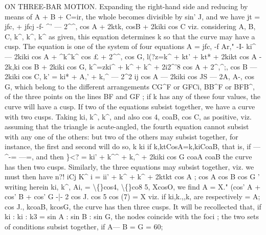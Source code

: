 \documentclass[12pt,a4paper]{article}
\begin{document}
ON THREE-BAR MOTION.
Expanding
the
right-hand
side
and
reducing
by means
of A + B + C=ir,
the
whole
becomes
divisible by
sin' J, and we have
jt\guillemotright{} = jfc,\guillemotright{} +
jfcj\guillemotright{} -f- \textasciicircum{}' --- 2\textasciicircum{}\textasciicircum{}, cos A + 2ktk, cosB + 2kiki cos C
viz.
considering A,
B,
C,
k\textasciicircum{},
k\textasciicircum{},
k\textasciicircum{}
as
given,
this
equation
determines k
so
that
the
curve may have a cusp.
The equation
is one of the system
of four equations
A\guillemotleft{} = jfc,\guillemotright{} -f Ar," -I- ki\textasciicircum{} --- 2kiki cos A + \textasciicircum{}k\textasciicircum{}k\textasciicircum{} cos \pounds{} + 2\textasciicircum{}\textasciicircum{}, cos G,
l(?z=k\textasciicircum{} + kt' + kt* + 2kikt cos A - 2k,ki cos B + 2kiki cos G,
k\textasciicircum{}=zki\textasciicircum{} + k\textasciicircum{} + k\textasciicircum{} + 2i2\textasciicircum{}'8 cos A + 2\textasciicircum{},\textasciicircum{};, cos B --- 2kiki cos C,
k' = ki* + A,' + k,\textasciicircum{} --- 2\textasciicircum{}2 ij cos A --- 2kiki cos JS --- 2A, A-, cos G,
which
belong to
the
different arrangements CG\textasciicircum{}F or GFCi, BB\textasciicircum{}F or BFB\textasciicircum{}, of the three
points
on
the
lines BF and GF
;
if k
has
any
of
these
four
values,
the
curve
will
have
a
cusp.
If two
of
the
equations
subsist
together,
we
have
a
curve
with
two
cusps.
Taking
ki,
k\textasciicircum{},
k\textasciicircum{}, and
also
cos 4, coaB, cos C, as
positive,
viz.
assuming that the
triangle
is acute-angled, the
fourth
equation cannot subsist with any one
of the others:
but two of the others may subsist
together,
for instance, the
first and second
will do
so,
k
ki
if k,ktCosA=k,kiCoaB, that
is,
if ---\textasciicircum{}-= ---=, and
then
\}<? = ki' + k\textasciicircum{}\textasciicircum{} + k,\textasciicircum{} + 2kiki cos G
coaA
coaB
the curve
has then
two
cusps.
Similarly, the
three equations may subsist together,
viz.
we must then have
n?!
iCj
K\textasciicircum{}
i\guillemotright{} = ii' + k\textasciicircum{} + k\textasciicircum{} + 2ktkt cos A
;
cos A
cos B
cos G
'
writing herein
ki,
k\textasciicircum{},
Ai, = \textbackslash\{\}cos4, \textbackslash\{\}co8 5, XcosO, we
find
A\guillemotright{} = X." (cos' A + cos' B + cos' G -|- 2 cos J. cos 5 cos (7) = X\guillemotright{}
viz.
if ki,k.,,k, are respectively = A; cos J., kcoaB, kcosG, the
curve has then three
cusps.
It
will be recollected
that,
if
ki
:
ki
:
k3 = sin A
: sin B
: sin G,
the
nodes
coincide
with
the
foci
;
the
two
sets
of
conditions
subsist
together,
if
A--- B = G = 60\textdegree{};
\end{document}
